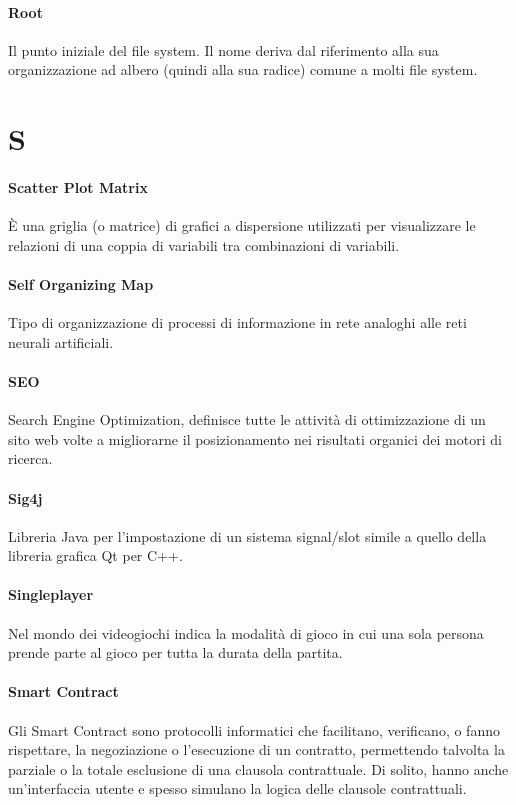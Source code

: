 \documentclass[]{article}
\begin{document}
	\paragraph*{Root}
	Il punto iniziale del file system. Il nome deriva dal riferimento alla sua organizzazione ad albero (quindi alla sua radice) comune a molti file system.

	\newpage

	\section*{S}

	\paragraph*{Scatter Plot Matrix}
	È una griglia (o matrice) di grafici a dispersione utilizzati per visualizzare le relazioni di una coppia di variabili tra combinazioni di variabili.

	\paragraph*{Self Organizing Map}
	Tipo di organizzazione di processi di informazione in rete analoghi alle reti neurali artificiali.

	\paragraph*{SEO}
	Search Engine Optimization, definisce tutte le attività di ottimizzazione di un sito web volte a migliorarne il posizionamento nei risultati organici dei motori di ricerca.

    \paragraph*{Sig4j}
    Libreria Java per l'impostazione di un sistema signal/slot simile a quello della libreria grafica Qt per C++.

	\paragraph*{Singleplayer}
	Nel mondo dei videogiochi indica la modalità di gioco in cui una sola persona prende parte al gioco per tutta la durata della partita.

	\paragraph*{Smart Contract}
	Gli Smart Contract sono protocolli informatici che facilitano, verificano, o fanno rispettare, la negoziazione o l'esecuzione di un contratto, permettendo talvolta la parziale o la totale esclusione di una clausola contrattuale. Di solito, hanno anche un'interfaccia utente e spesso simulano la logica delle clausole contrattuali.
\end{document}

